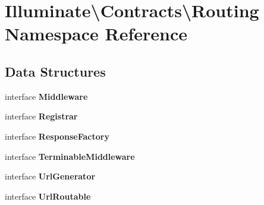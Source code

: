 \section{Illuminate\textbackslash{}Contracts\textbackslash{}Routing Namespace Reference}
\label{namespace_illuminate_1_1_contracts_1_1_routing}
\subsection*{Data Structures}
\begin{DoxyCompactItemize}
\item 
interface {\bf Middleware}
\item 
interface {\bf Registrar}
\item 
interface {\bf Response\+Factory}
\item 
interface {\bf Terminable\+Middleware}
\item 
interface {\bf Url\+Generator}
\item 
interface {\bf Url\+Routable}
\end{DoxyCompactItemize}
